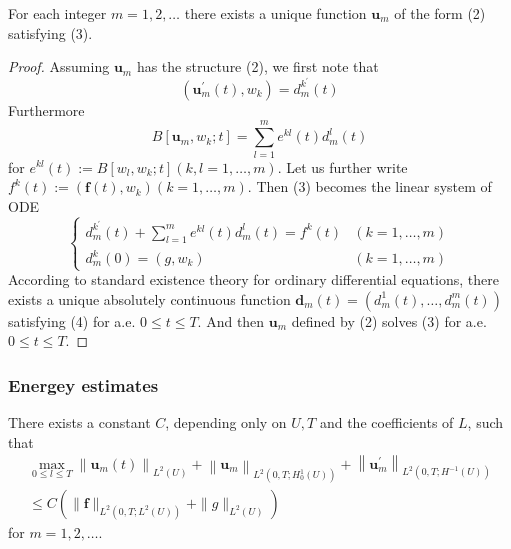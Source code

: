\begin{theorem}
    For each integer $m=1,2, \ldots$ there exists a unique function $\mathbf{u}_m$ of the form (2) satisfying (3).

    \begin{proof}
        Assuming $\mathbf{u}_m$ has the structure (2), we first note that
        \begin{equation*}
            \left(\mathbf{u}_m^{\prime}(t), w_k\right)=d_m^{k^{\prime}}(t)
        \end{equation*}
        Furthermore
        \begin{equation*}
            B\left[\mathbf{u}_m, w_k ; t\right]=\sum_{l=1}^m e^{k l}(t) d_m^l(t)
        \end{equation*}
        for $e^{k l}(t):=B\left[w_l, w_k ; t\right](k, l=1, \ldots, m)$. Let us further write $f^k(t):= \left(\mathbf{f}(t), w_k\right)(k=1, \ldots, m)$. Then (3) becomes the linear system of ODE
        \begin{equation}
            \left\{\begin{aligned}
                d_m^{k^{\prime}}(t)+\sum_{l=1}^m e^{k l}(t) d_m^l(t)=f^k(t) & (k=1, \ldots, m) \\
                d_m^k(0)=\left(g, w_k\right)                                & (k=1, \ldots, m)
            \end{aligned}\right.
        \end{equation}
        According to standard existence theory for ordinary differential equations, there exists a unique absolutely continuous function $\mathbf{d}_m(t)=\left(d_m^1(t), \ldots, d_m^m(t)\right)$ satisfying (4) for a.e. $0 \leq t \leq T$. And then $\mathbf{u}_m$ defined by (2) solves (3) for a.e. $0 \leq t \leq T$.
    \end{proof}
\end{theorem}

\subsubsection{Energey estimates}

\begin{theorem}
    There exists a constant $C$, depending only on $U, T$ and the coefficients of $L$, such that
    \begin{equation*}
        \begin{array}{r}
            \max\limits_{0 \leq l \leq T}\left\|\mathbf{u}_m(t)\right\|_{L^2(U)}+\left\|\mathbf{u}_m\right\|_{L^2\left(0, T ; H_0^{1}(U)\right)}+\left\|\mathbf{u}_m^{\prime}\right\|_{L^2\left(0, T ; H^{-1}(U)\right)} \\
            \leq C\left(\|\mathbf{f}\|_{L^2\left(0, T ; L^2(U)\right)}+\|g\|_{L^2(U)}\right)
        \end{array}
    \end{equation*}
    for $m=1,2, \ldots$.
\end{theorem}

